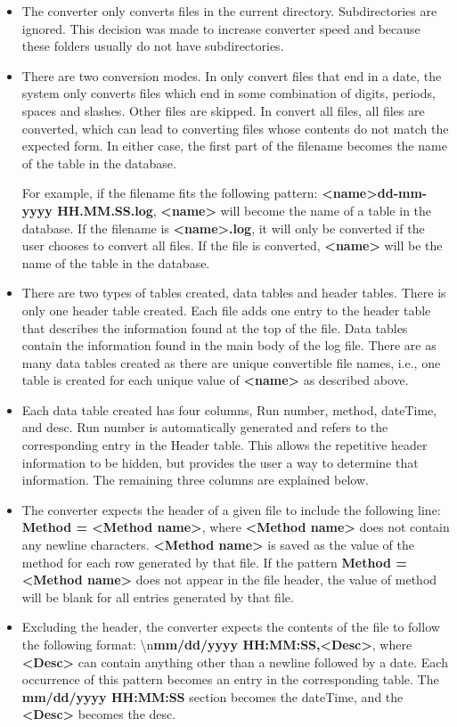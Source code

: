\documentclass[letterpaper,11pt,twoside,final]{article}
\begin{document}
\begin{itemize}
  \item The converter only converts files in the current
directory. Subdirectories are ignored. This decision was made to
increase converter speed and because these folders usually
do not have subdirectories. 
  \item There are two conversion modes. In only convert files that end
    in a date, the system only converts files which end in some
    combination of digits, periods, spaces and slashes. Other files
    are skipped. In convert all files, all files are converted, which
    can lead to converting files whose contents do not match the
    expected form. In either case, the first part of the filename
    becomes the name of the table in the database.

    For example, if the filename fits the following pattern:
    \textbf{<name>dd-mm-yyyy HH.MM.SS.log},
    \textbf{<name>} will
    become the name of a table in the database. If the filename is
    \textbf{<name>.log}, it will only be converted if the user chooses
    to convert all files. If the file is converted, \textbf{<name>}
    will be the name of the table in the database.
  \item There are two types of tables created, data tables and header
    tables. There is only one header table created. Each file adds one
    entry to the header table that describes the information found at
    the top of the file. Data tables contain the information
    found in the main body of the log file. There are as many data
    tables created as there are unique convertible file names, i.e., one
    table is created for each unique value of \textbf{<name>} as
    described above.
    \item
    Each data table created has four columns, Run number, method, dateTime, and
    desc. Run number is automatically generated and refers to the
    corresponding entry in the Header table. This allows the
    repetitive header information to be hidden, but provides the user
    a way to determine that information. The remaining three columns
    are explained below.
  \item The converter expects the header of a given file to include
    the following line: \textbf{Method = <Method name>}, where
    \textbf{<Method name>} does not contain any newline characters. \textbf{<Method name>} is
    saved as the value of the method for each row generated by that
    file. If the pattern \textbf{Method = <Method name>} does not
    appear in the file header, the value of method will be blank for
    all entries generated by that file.
  \item Excluding the header, the converter expects the contents of
    the file to follow the following format: \textbackslash n\textbf{mm/dd/yyyy HH:MM:SS,<Desc>}, where \textbf{<Desc>} can
    contain anything other than a newline followed by a date. Each
    occurrence of this pattern becomes an entry in the corresponding
    table. The \textbf{mm/dd/yyyy HH:MM:SS} section becomes the dateTime, and
    the \textbf{<Desc>} becomes the desc.
\end{itemize}
\end{document}
